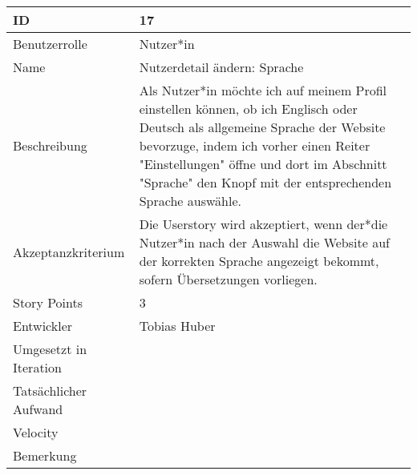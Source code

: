 \begin{tabularx}{\textwidth}{|p{}|X|}
	\hline
	ID & 17\\
	\hline
	Benutzerrolle & Nutzer*in\\
	\hline
	Name & Nutzerdetail ändern: Sprache \\
	\hline
	Beschreibung & Als Nutzer*in möchte ich auf meinem Profil einstellen können, ob ich Englisch oder Deutsch als allgemeine Sprache der Website bevorzuge, indem ich vorher einen Reiter "Einstellungen" öffne und dort im Abschnitt "Sprache" den Knopf mit der entsprechenden Sprache auswähle.\\
	\hline
	Akzeptanzkriterium & Die Userstory wird akzeptiert, wenn der*die Nutzer*in nach der Auswahl die Website auf der korrekten Sprache angezeigt bekommt, sofern Übersetzungen vorliegen. \\
	\hline
	Story Points & 3\\
	\hline
	Entwickler & Tobias Huber\\
	\hline
	Umgesetzt in Iteration & \\ 
	\hline
	Tatsächlicher Aufwand & \\
	\hline
	Velocity & \\
	\hline
	Bemerkung & \\
	\hline
\end{tabularx}
\vspace{20pt}
